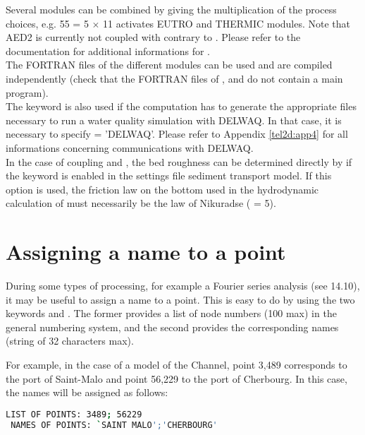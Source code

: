 Several modules can be combined by giving the multiplication of the process
choices, e.g. 55 = 5 $\times$ 11 activates EUTRO and THERMIC modules.
Note that AED2 is currently not coupled with  contrary to
.
Please refer to the \waqtel documentation for additional informations for
\waqtel.\\

The FORTRAN files of the different modules can be used and are compiled
independently (check that the FORTRAN files of \gaia, \sisyphe and \tomawac
do not contain a main program).\\

The keyword  is also used if the computation
has to generate the appropriate files necessary to run a water quality
simulation with DELWAQ.
In that case, it is necessary to specify  = 'DELWAQ'.
Please refer to Appendix \ref{tel2d:app4} for all informations concerning
communications with DELWAQ.\\

In the case of coupling  and \sisyphe, the bed roughness can be
determined directly by \sisyphe if the keyword
 is enabled in the settings file
sediment transport model.
If this option is used, the friction law on the bottom used
in the hydrodynamic calculation of  must necessarily be
the law of Nikuradse ( = 5).


\section{Assigning a name to a point}

During some types of processing, for example a Fourier series analysis
(see 14.10),
it may be useful to assign a name to a point.
This is easy to do by using the two keywords 
and .
The former provides a list of node numbers (100 max) in the general numbering
system,
and the second provides the corresponding names (string of 32 characters max).

For example, in the case of a model of the Channel, point 3,489 corresponds
to the port of Saint-Malo and point 56,229 to the port of Cherbourg.
In this case, the names will be assigned as follows:
\begin{lstlisting}[language=bash]
 LIST OF POINTS: 3489; 56229
 NAMES OF POINTS: `SAINT MALO';'CHERBOURG'
\end{lstlisting}

